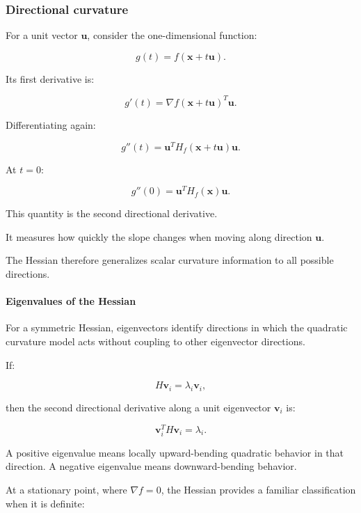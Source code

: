 \subsubsection{Directional curvature}\label{02-foundations-ii-ch021-directional-curvature}

For a unit vector \(\mathbf u\), consider the one-dimensional function:

\[
g(t)=f(\mathbf x+t\mathbf u).
\]

Its first derivative is:

\[
g'(t)=\nabla f(\mathbf x+t\mathbf u)^T\mathbf u.
\]

Differentiating again:

\[
g''(t)=\mathbf u^TH_f(\mathbf x+t\mathbf u)\mathbf u.
\]

At \(t=0\):

\[
\boxed{ g''(0)=\mathbf u^TH_f(\mathbf x)\mathbf u }.
\]

This quantity is the second directional derivative.

It measures how quickly the slope changes when moving along direction \(\mathbf u\).

The Hessian therefore generalizes scalar curvature information to all possible directions.

\paragraph{Eigenvalues of the Hessian}\label{02-foundations-ii-ch021-eigenvalues-of-the-hessian}

For a symmetric Hessian, eigenvectors identify directions in which the quadratic curvature model acts without coupling to other eigenvector directions.

If:

\[
H\mathbf v_i=\lambda_i\mathbf v_i,
\]

then the second directional derivative along a unit eigenvector \(\mathbf v_i\) is:

\[
\mathbf v_i^TH\mathbf v_i=\lambda_i.
\]

A positive eigenvalue means locally upward-bending quadratic behavior in that direction. A negative eigenvalue means downward-bending behavior.

At a stationary point, where \(\nabla f=0\), the Hessian provides a familiar classification when it is definite:

